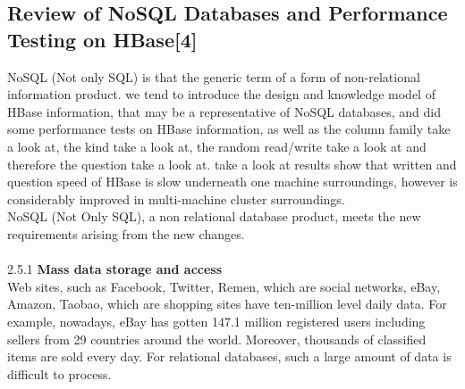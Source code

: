 \documentclass[12pt, a4paper]{article}
\begin{document}
\vspace{5mm}
\subsection{Review of NoSQL Databases and Performance Testing on HBase[4]}

\vspace{5mm}

NoSQL (Not only SQL) is that the generic term of a form of non-relational information product. we tend to introduce the design and knowledge model of HBase information, that may be a representative of NoSQL databases, and did some performance tests on HBase information, as well as the column family take a look at, the kind take a look at, the random read/write take a look at and therefore the question take a look at. take a look at results show that written and question speed of HBase is slow underneath one machine surroundings, however is considerably improved in multi-machine cluster surroundings.
\\
\hspace{5mm}NoSQL (Not Only SQL), a non relational database product, meets the new requirements arising from the new changes.
\\\\
2.5.1\textbf{ Mass data storage and access}\\Web sites, such as Facebook, Twitter, Remen, which are social networks, eBay, Amazon, Taobao, which are shopping sites have ten-million level daily data. For example, nowadays, eBay has gotten 147.1 million registered users including sellers from 29 countries around the world. Moreover, thousands of classified items are sold every day. For relational databases, such a large amount of data is difficult to process.\\
\end{document}
